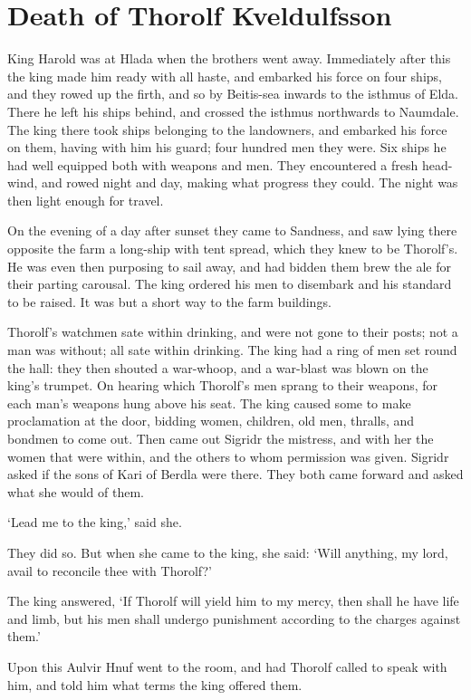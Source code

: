 \chapter{Death of Thorolf Kveldulfsson}
King Harold was at Hlada when the brothers went away. Immediately after this the king made him ready with all haste, and embarked his force on four ships, and they rowed up the firth, and so by Beitis-sea inwards to the isthmus of Elda. There he left his ships behind, and crossed the isthmus northwards to Naumdale. The king there took ships belonging to the landowners, and embarked his force on them, having with him his guard; four hundred men they were. Six ships he had well equipped both with weapons and men. They encountered a fresh head-wind, and rowed night and day, making what progress they could. The night was then light enough for travel.

On the evening of a day after sunset they came to Sandness, and saw lying there opposite the farm a long-ship with tent spread, which they knew to be Thorolf's. He was even then purposing to sail away, and had bidden them brew the ale for their parting carousal. The king ordered his men to disembark and his standard to be raised. It was but a short way to the farm buildings.

Thorolf's watchmen sate within drinking, and were not gone to their posts; not a man was without; all sate within drinking. The king had a ring of men set round the hall: they then shouted a war-whoop, and a war-blast was blown on the king's trumpet. On hearing which Thorolf's men sprang to their weapons, for each man's weapons hung above his seat. The king caused some to make proclamation at the door, bidding women, children, old men, thralls, and bondmen to come out. Then came out Sigridr the mistress, and with her the women that were within, and the others to whom permission was given. Sigridr asked if the sons of Kari of Berdla were there. They both came forward and asked what she would of them.

`Lead me to the king,' said she.

They did so. But when she came to the king, she said: `Will anything, my lord, avail to reconcile thee with Thorolf?'

The king answered, `If Thorolf will yield him to my mercy, then shall he have life and limb, but his men shall undergo punishment according to the charges against them.'

Upon this Aulvir Hnuf went to the room, and had Thorolf called to speak with him, and told him what terms the king offered them.


